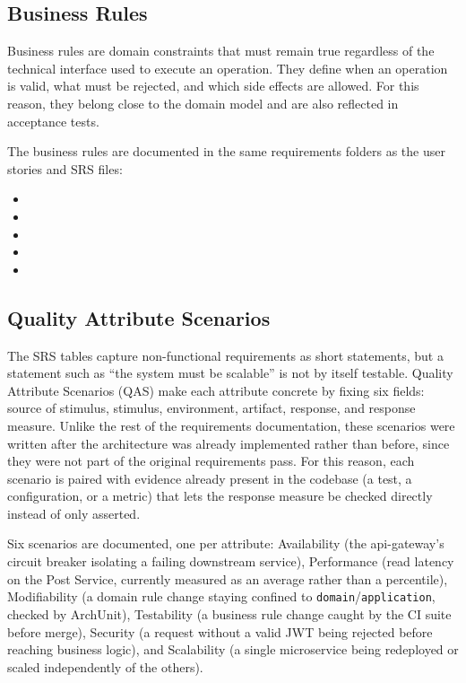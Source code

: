 \documentclass[12pt,a4paper]{article}
\begin{document}
\subsection{Business Rules}

Business rules are domain constraints that must remain true regardless of the technical interface used to execute an operation. They define when an operation is valid, what must be rejected, and which side effects are allowed. For this reason, they belong close to the domain model and are also reflected in acceptance tests.

The business rules are documented in the same requirements folders as the user stories and SRS files:

\begin{itemize}
    \item {}
    \item {}
    \item {}
    \item {}
    \item {}
\end{itemize}

\subsection{Quality Attribute Scenarios}

The SRS tables capture non-functional requirements as short statements, but a statement such as ``the system must be scalable'' is not by itself testable. Quality Attribute Scenarios (QAS) make each attribute concrete by fixing six fields: source of stimulus, stimulus, environment, artifact, response, and response measure. Unlike the rest of the requirements documentation, these scenarios were written after the architecture was already implemented rather than before, since they were not part of the original requirements pass. For this reason, each scenario is paired with evidence already present in the codebase (a test, a configuration, or a metric) that lets the response measure be checked directly instead of only asserted.

Six scenarios are documented, one per attribute: Availability (the api-gateway's circuit breaker isolating a failing downstream service), Performance (read latency on the Post Service, currently measured as an average rather than a percentile), Modifiability (a domain rule change staying confined to \texttt{domain}/\texttt{application}, checked by ArchUnit), Testability (a business rule change caught by the CI suite before merge), Security (a request without a valid JWT being rejected before reaching business logic), and Scalability (a single microservice being redeployed or scaled independently of the others).
\end{document}
